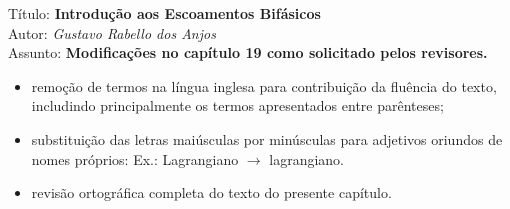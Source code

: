\documentclass[a4paper,fleqn,12pt,twoside]{report} %
\begin{document}
\noindent T\'itulo: \textbf{Introdu\c c\~ao aos Escoamentos Bif\'asicos}\\
Autor: \textit{Gustavo Rabello dos Anjos}\\
Assunto: \textbf{Modifica\c c\~oes no cap\'itulo 19 como solicitado
pelos revisores.}\\

\begin{itemize}
 \item remo\c c\~ao de termos na l\'ingua inglesa para contribui\c c\~ao
 da flu\^encia do texto, includindo principalmente os termos
 apresentados entre par\^enteses;
 \item substitui\c c\~ao das letras mai\'usculas por min\'usculas para adjetivos
  oriundos de nomes pr\'oprios: Ex.: Lagrangiano $\to$ lagrangiano.
 \item revis\~ao ortogr\'afica completa do texto do presente cap\'itulo.
\end{itemize}
\end{document}
